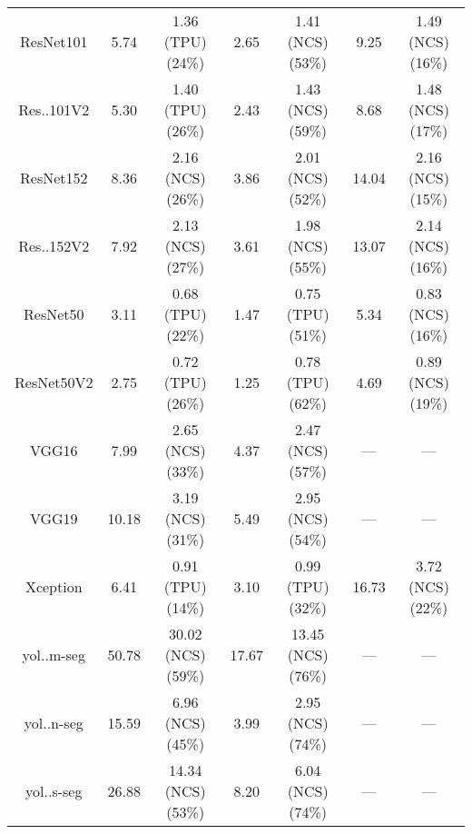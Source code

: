 \begin{tabular}{c|cc|cc|cc}
        ResNet101 & 5.74 & 1.36 (\colorbox{RC}{TPU}) (\colorbox{RC}{24\%}) & 2.65 & 1.41 (\colorbox{RA}{NCS}) (\colorbox{RC}{53\%}) & 9.25 & 1.49 (\colorbox{RA}{NCS}) (\colorbox{RA}{16\%}) \\
        Res..101V2 & 5.30 & 1.40 (\colorbox{RC}{TPU}) (\colorbox{RC}{26\%}) & 2.43 & 1.43 (\colorbox{RA}{NCS}) (\colorbox{RC}{59\%}) & 8.68 & 1.48 (\colorbox{RA}{NCS}) (\colorbox{RA}{17\%}) \\
        ResNet152 & 8.36 & 2.16 (\colorbox{RA}{NCS}) (\colorbox{RC}{26\%}) & 3.86 & 2.01 (\colorbox{RA}{NCS}) (\colorbox{RC}{52\%}) & 14.04 & 2.16 (\colorbox{RA}{NCS}) (\colorbox{RA}{15\%}) \\
        Res..152V2 & 7.92 & 2.13 (\colorbox{RA}{NCS}) (\colorbox{RC}{27\%}) & 3.61 & 1.98 (\colorbox{RA}{NCS}) (\colorbox{RC}{55\%}) & 13.07 & 2.14 (\colorbox{RA}{NCS}) (\colorbox{RA}{16\%}) \\
        ResNet50 & 3.11 & 0.68 (\colorbox{RC}{TPU}) (\colorbox{RC}{22\%}) & 1.47 & 0.75 (\colorbox{RC}{TPU}) (\colorbox{RC}{51\%}) & 5.34 & 0.83 (\colorbox{RA}{NCS}) (\colorbox{RA}{16\%}) \\
        ResNet50V2 & 2.75 & 0.72 (\colorbox{RC}{TPU}) (\colorbox{RC}{26\%}) & 1.25 & 0.78 (\colorbox{RC}{TPU}) (\colorbox{RE}{62\%}) & 4.69 & 0.89 (\colorbox{RA}{NCS}) (\colorbox{RA}{19\%}) \\
        VGG16 & 7.99 & 2.65 (\colorbox{RA}{NCS}) (\colorbox{RC}{33\%}) & 4.37 & 2.47 (\colorbox{RA}{NCS}) (\colorbox{RC}{57\%}) & --- & --- \\
        VGG19 & 10.18 & 3.19 (\colorbox{RA}{NCS}) (\colorbox{RC}{31\%}) & 5.49 & 2.95 (\colorbox{RA}{NCS}) (\colorbox{RC}{54\%}) & --- & --- \\
        Xception & 6.41 & 0.91 (\colorbox{RC}{TPU}) (\colorbox{RA}{14\%}) & 3.10 & 0.99 (\colorbox{RC}{TPU}) (\colorbox{RC}{32\%}) & 16.73 & 3.72 (\colorbox{RA}{NCS}) (\colorbox{RC}{22\%}) \\
        yol..m-seg & 50.78 & 30.02 (\colorbox{RA}{NCS}) (\colorbox{RC}{59\%}) & 17.67 & 13.45 (\colorbox{RA}{NCS}) (\colorbox{RE}{76\%}) & --- & --- \\
        yol..n-seg & 15.59 & 6.96 (\colorbox{RA}{NCS}) (\colorbox{RC}{45\%}) & 3.99 & 2.95 (\colorbox{RA}{NCS}) (\colorbox{RE}{74\%}) & --- & --- \\
        yol..s-seg & 26.88 & 14.34 (\colorbox{RA}{NCS}) (\colorbox{RC}{53\%}) & 8.20 & 6.04 (\colorbox{RA}{NCS}) (\colorbox{RE}{74\%}) & --- & --- \\
    \end{tabular}